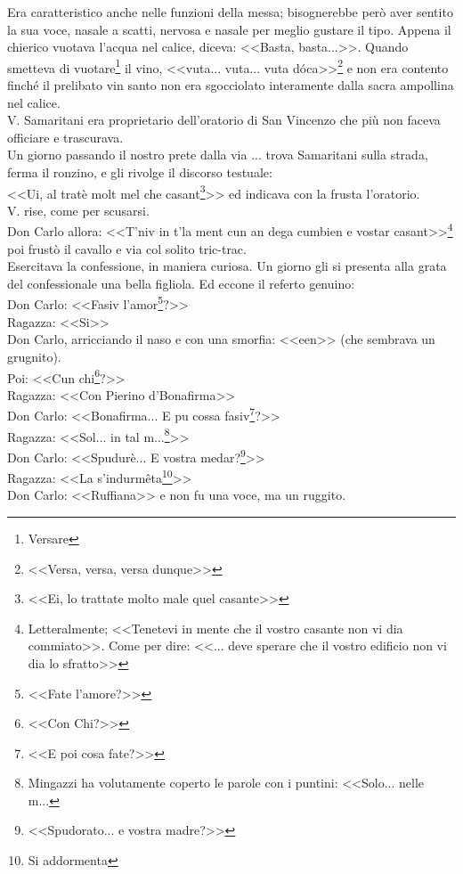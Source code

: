 Era caratteristico anche nelle funzioni della messa; bisognerebbe però aver sentito la sua voce, nasale a scatti, nervosa e nasale per meglio gustare il tipo. Appena il chierico vuotava l'acqua nel calice, diceva: <<Basta, basta...>>. Quando smetteva di vuotare\footnote{Versare} il vino, <<vuta... vuta... vuta dóca>>\footnote{<<Versa, versa, versa dunque>>} e non era contento finché il prelibato vin santo non era sgocciolato interamente dalla sacra ampollina nel calice.\\
V. Samaritani era proprietario dell'oratorio di San Vincenzo che più non faceva officiare e trascurava.\\
Un giorno passando il nostro prete dalla via ... trova Samaritani sulla strada, ferma il ronzino, e gli rivolge il discorso testuale:\\
\indent <<Ui, al tratè molt mel che casant\footnote{<<Ei, lo trattate molto male quel casante>>}>> ed indicava con la frusta l'oratorio.\\
\indent V. rise, come per scusarsi.\\
\indent Don Carlo allora: <<T'niv in t'la ment cun an dega cumbien e vostar casant>>\footnote{Letteralmente; <<Tenetevi in mente che il vostro casante non vi dia commiato>>. Come per dire: <<... deve sperare che il vostro edificio non vi dia lo sfratto>>} poi frustò il cavallo e via col solito tric-trac.\\

Esercitava la confessione, in maniera curiosa. Un giorno gli si presenta alla grata del confessionale una bella figliola. Ed eccone il referto genuino:\\
\indent {}Don Carlo: <<Fasiv l'amor\footnote{<<Fate l'amore?>>}?>>\\
\indent Ragazza: <<Si>>\\
\indent {}Don Carlo, arricciando il naso e con una smorfia: <<een>> (che sembrava un grugnito).\\
\indent Poi: <<Cun chi\footnote{<<Con Chi?>>}?>>\\
\indent Ragazza: <<Con Pierino d'Bonafirma>>\\
\indent {}Don Carlo: <<Bonafirma... E pu cossa fasiv\footnote{<<E poi cosa fate?>>}?>>\\
\indent Ragazza: <<Sol... in tal m...\footnote{Mingazzi ha volutamente coperto le parole con i puntini: <<Solo... nelle m...}>>\\
\indent {}Don Carlo: <<Spudurè... E vostra medar?\footnote{<<Spudorato... e vostra madre?>>}>>\\
\indent Ragazza: <<La s'indurmêta\footnote{Si addormenta}>>\\
\indent {}Don Carlo: <<Ruffiana>> e non fu una voce, ma un ruggito.\\



